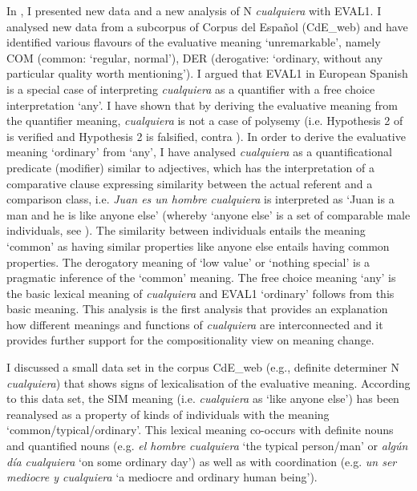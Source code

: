   In , I presented new data and a new analysis of N \textit{cualquiera} with EVAL1. I analysed new data from a subcorpus of Corpus del Español (CdE\_web) and have identified various flavours of the evaluative meaning ‘unremarkable’, namely COM (common: ‘regular, normal’), DER (derogative: ‘ordinary, without any particular quality worth mentioning’). I argued that EVAL1 in European Spanish is a special case of interpreting \textit{cualquiera} as a quantifier with a free choice interpretation ‘any’. I have shown that by deriving the evaluative meaning from the quantifier meaning, \textit{cualquiera} is not a case of polysemy (i.e. Hypothesis 2 of  is verified and Hypothesis 2 is falsified, contra \citealt{AlonsoMenendez2018}). In order to derive the evaluative meaning ‘ordinary’ from ‘any’, I have analysed \textit{cualquiera} as a quantificational predicate (modifier) similar to adjectives, which has the interpretation of a comparative clause expressing similarity between the actual referent and a comparison class, i.e. \textit{Juan es un hombre cualquiera} is interpreted as ‘Juan is a man and he is like anyone else’ (whereby ‘anyone else’ is a set of comparable male individuals, see ). The similarity between individuals entails the meaning ‘common’ as having similar properties like anyone else entails having common properties. The derogatory meaning of ‘low value’ or ‘nothing special’ is a pragmatic inference of the ‘common’ meaning. The free choice meaning ‘any’ is the basic lexical meaning of \textit{cualquiera} and EVAL1 ‘ordinary’ follows from this basic meaning. This analysis is the first analysis that provides an explanation how different meanings and functions of \textit{cualquiera} are interconnected and it provides further support for the compositionality view on meaning change.

  I discussed a small data set in the corpus CdE\_web (e.g., definite determiner N \textit{cualquiera}) that shows signs of lexicalisation of the evaluative meaning. According to this data set, the SIM meaning (i.e. \textit{cualquiera} as ‘like anyone else’) has been reanalysed as a property of kinds of individuals with the meaning ‘common/typical/ordinary’. This lexical meaning co-occurs with definite nouns and quantified nouns (e.g. \textit{el hombre cualquiera} ‘the typical person/man’ or \textit{algún día cualquiera} ‘on some ordinary day’) as well as with coordination (e.g. \textit{un ser mediocre y cualquiera} ‘a mediocre and ordinary human being’).

